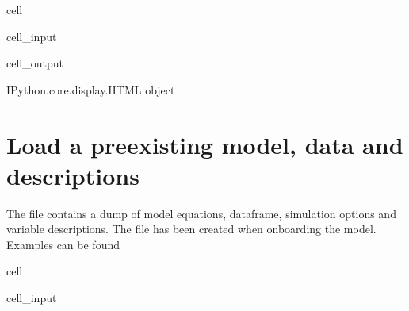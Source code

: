 \documentclass[letterpaper,10pt,english]{jupyterBook}
\begin{document}
\begin{sphinxuseclass}{cell}\begin{sphinxVerbatimInput}

\begin{sphinxuseclass}{cell_input}
\begin{sphinxVerbatim}[commandchars=\\\{\}]
    
\end{sphinxVerbatim}

\end{sphinxuseclass}\end{sphinxVerbatimInput}
\begin{sphinxVerbatimOutput}

\begin{sphinxuseclass}{cell_output}
\begin{sphinxVerbatim}[commandchars=\\\{\}]
\PYGZlt{}IPython.core.display.HTML object\PYGZgt{}
\end{sphinxVerbatim}

\end{sphinxuseclass}\end{sphinxVerbatimOutput}

\end{sphinxuseclass}

\section{Load a pre\sphinxhyphen{}existing model, data and descriptions}
\label{\detokenize{content/howto/experiments/create_experiment:load-a-pre-existing-model-data-and-descriptions}}
\sphinxAtStartPar
The file  contains a dump of model equations, dataframe, simulation options and variable descriptions. The file has been created when onboarding the model.
Examples can be found 

\begin{sphinxuseclass}{cell}\begin{sphinxVerbatimInput}

\begin{sphinxuseclass}{cell_input}
\begin{sphinxVerbatim}[commandchars=\\\{\}]
  
\end{sphinxVerbatim}

\end{sphinxuseclass}\end{sphinxVerbatimInput}

\end{sphinxuseclass}
\end{document}
